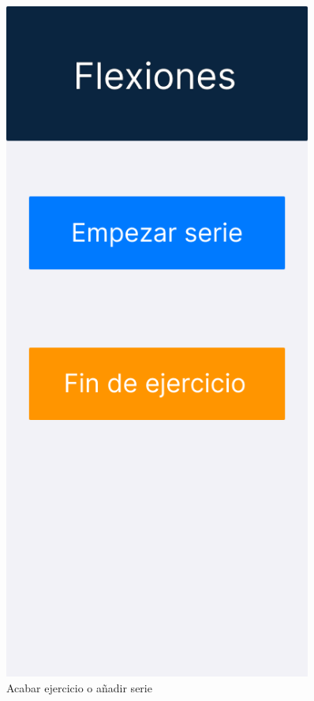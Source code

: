 \begin{figure}[H]
\begin{minipage}{0.45\textwidth}
      \centering
      \includegraphics[width=0.9\textwidth]{fotos/Frame 62.png}
      \caption{Acabar ejercicio o añadir serie}
      \label{fig:Acabar ejercicio o añadir serie}
   \end{minipage}
\end{figure}

